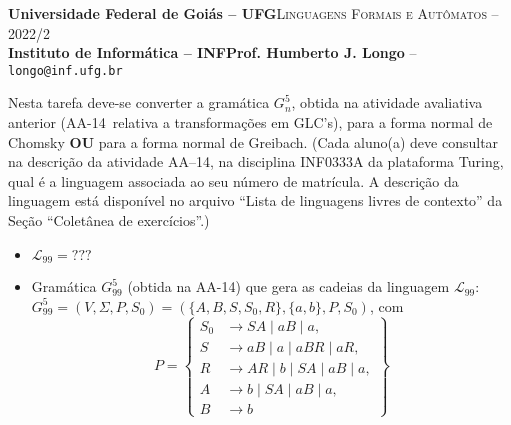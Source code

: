 \documentclass[12pt]{article}
\def\discente{Fulana(o) de tal}
\def\matricula{20010101}
\def\ua{15}
\def\up{14}
\def\myling{{99}} %
\begin{document}
 \begin{tcolorbox}[rounded corners, colback=blue!3, colframe=blue!40!black]
  \footnotesize\textbf{Universidade Federal de Goiás -- UFG}\hfill \textsc{Linguagens Formais e Autômatos -- 2022/2}\\
  \footnotesize\textbf{Instituto de Informática -- INF\hfill Prof. Humberto J. Longo} -- \scriptsize\texttt{longo@inf.ufg.br}
 \end{tcolorbox}\bigskip
%
\begin{tcolorbox}[rounded corners, colback=blue!2, colframe=blue!40!black, title=\textbf{Atividade AA-\ua}]
 Nesta tarefa deve-se converter a gramática $G_n^5$, obtida na atividade avaliativa anterior (AA-\up\ relativa a transformações em GLC's), para a forma normal de Chomsky \textbf{OU} para a forma normal de Greibach. (Cada aluno(a) deve consultar na descrição da atividade AA--\up, na disciplina INF0333A da plataforma Turing, qual é a linguagem associada ao seu número de matrícula. A descrição da linguagem está disponível no arquivo ``Lista de linguagens livres de contexto'' da Seção ``Coletânea de exercícios''.)
\end{tcolorbox}\bigskip

%
\begin{tcolorbox}[rounded corners, colback=yellow!5, colframe=red!40!black, title={\discente\ (\matricula)}]
\begin{itemize}
  \item  $\mathcal{L}_{\myling} = ???$
  \item Gramática $G_{\myling}^5$ (obtida na AA-\up) que gera as cadeias da linguagem $\mathcal{L}_{\myling}$:\\
  $G_{\myling}^5=(V,\Sigma,P,S_0)=(\{A,B,S,S_0,R\},\{a,b\},P,S_0)$, com
    \[P=\left\{
     \begin{aligned}
      S_0 & \to SA\mid aB\mid a, \\
      S   & \to aB\mid a\mid aBR\mid aR, \\
      R   & \to AR\mid b\mid SA\mid aB\mid a, \\
      A   & \to b\mid SA\mid aB\mid a, \\
      B   & \to b
     \end{aligned}
    \right\}\]
 \end{itemize}
\end{tcolorbox}\bigskip
\end{document}
